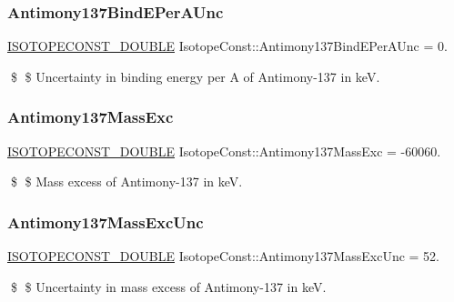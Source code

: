 \subsubsection{\texorpdfstring{Antimony137\+Bind\+E\+Per\+A\+Unc}{Antimony137BindEPerAUnc}}
{\footnotesize\ttfamily \mbox{\hyperlink{group___isotope_const-_macros_ga8f45a7272ce02c0b4c65c44636ed719a}{I\+S\+O\+T\+O\+P\+E\+C\+O\+N\+S\+T\+\_\+\+D\+O\+U\+B\+LE}} Isotope\+Const\+::\+Antimony137\+Bind\+E\+Per\+A\+Unc = 0.}

\$ \$ Uncertainty in binding energy per A of Antimony-\/137 in keV. \mbox{\label{group___isotope_const-_antimony-_sb137_gab48a3896a6a2c34fbb851882091f931c}} 
\subsubsection{\texorpdfstring{Antimony137\+Mass\+Exc}{Antimony137MassExc}}
{\footnotesize\ttfamily \mbox{\hyperlink{group___isotope_const-_macros_ga8f45a7272ce02c0b4c65c44636ed719a}{I\+S\+O\+T\+O\+P\+E\+C\+O\+N\+S\+T\+\_\+\+D\+O\+U\+B\+LE}} Isotope\+Const\+::\+Antimony137\+Mass\+Exc = -\/60060.}

\$ \$ Mass excess of Antimony-\/137 in keV. \mbox{\label{group___isotope_const-_antimony-_sb137_gada87d71c0b0e5ce68e3724de7ed918d9}} 
\subsubsection{\texorpdfstring{Antimony137\+Mass\+Exc\+Unc}{Antimony137MassExcUnc}}
{\footnotesize\ttfamily \mbox{\hyperlink{group___isotope_const-_macros_ga8f45a7272ce02c0b4c65c44636ed719a}{I\+S\+O\+T\+O\+P\+E\+C\+O\+N\+S\+T\+\_\+\+D\+O\+U\+B\+LE}} Isotope\+Const\+::\+Antimony137\+Mass\+Exc\+Unc = 52.}

\$ \$ Uncertainty in mass excess of Antimony-\/137 in keV. \mbox{\label{group___isotope_const-_antimony-_sb137_ga0d28bd85472e7e322d27701661dd475a}} 
